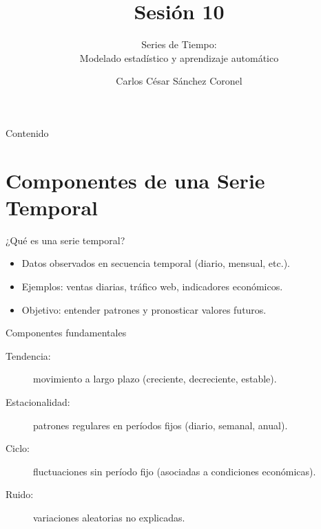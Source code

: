 \documentclass[aspectratio=169, 10pt, xcolor=table]{beamer}
\title[SESIÓN 10]{\textbf{Sesión 10}}
\subtitle{Series de Tiempo: \\ Modelado estadístico y aprendizaje automático}
\author[Prof. C. Sánchez]{Carlos César Sánchez Coronel}
\institute{\textbf{MACHINE LEARNING}}
\date{}
\begin{document}
\begin{frame}
    \titlepage
\end{frame}

\begin{frame}{Contenido}
    \tableofcontents
\end{frame}

\section{Componentes de una Serie Temporal}

\begin{frame}{¿Qué es una serie temporal?}
    \begin{itemize}
        \item Datos observados en secuencia temporal (diario, mensual, etc.).
        \item Ejemplos: ventas diarias, tráfico web, indicadores económicos.
        \item Objetivo: entender patrones y pronosticar valores futuros.
    \end{itemize}
    \vspace{0.3cm}
    \begin{block}{Componentes fundamentales}
        \begin{description}
            \item[Tendencia:] movimiento a largo plazo (creciente, decreciente, estable).
            \item[Estacionalidad:] patrones regulares en períodos fijos (diario, semanal, anual).
            \item[Ciclo:] fluctuaciones sin período fijo (asociadas a condiciones económicas).
            \item[Ruido:] variaciones aleatorias no explicadas.
        \end{description}
    \end{block}
\end{frame}
\end{document}
